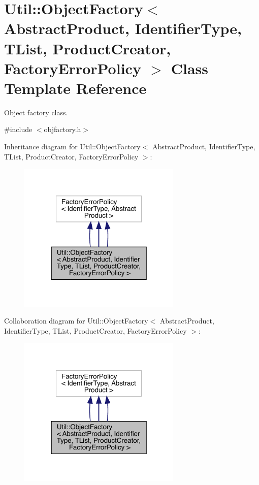 \hypertarget{classUtil_1_1ObjectFactory}{}\section{Util\+:\+:Object\+Factory$<$ Abstract\+Product, Identifier\+Type, T\+List, Product\+Creator, Factory\+Error\+Policy $>$ Class Template Reference}
\label{classUtil_1_1ObjectFactory}


Object factory class.  




{\ttfamily \#include $<$objfactory.\+h$>$}



Inheritance diagram for Util\+:\+:Object\+Factory$<$ Abstract\+Product, Identifier\+Type, T\+List, Product\+Creator, Factory\+Error\+Policy $>$\+:
\nopagebreak
\begin{figure}[H]
\begin{center}
\leavevmode
\includegraphics[width=220pt]{d9/d7d/classUtil_1_1ObjectFactory__inherit__graph}
\end{center}
\end{figure}


Collaboration diagram for Util\+:\+:Object\+Factory$<$ Abstract\+Product, Identifier\+Type, T\+List, Product\+Creator, Factory\+Error\+Policy $>$\+:
\nopagebreak
\begin{figure}[H]
\begin{center}
\leavevmode
\includegraphics[width=220pt]{d6/d0b/classUtil_1_1ObjectFactory__coll__graph}
\end{center}
\end{figure}
